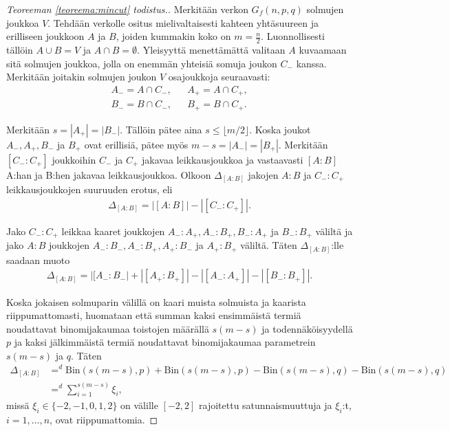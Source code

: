 \documentclass[finnish,12pt,a4paper,pdftex,sci,utf8]{aaltothesis}
\newcommand\floor[1]{\lfloor#1\rfloor}
\begin{document}
\begin{proof}[Teoreeman \ref{teoreema:mincut} todistus.]
	Merkitään verkon $G_f(n,p,q)$ solmujen joukkoa $V$.
	Tehdään verkolle ositus mielivaltaisesti kahteen yhtäsuureen ja erilliseen joukkoon $A$ ja $B$, joiden kummakin koko on $m = \frac{n}{2}$.
	Luonnollisesti tällöin $A \cup B = V$ ja $A \cap B = \emptyset$. Yleisyyttä menettämättä valitaan $A$ kuvaamaan sitä solmujen joukkoa, jolla on enemmän yhteisiä somuja joukon $C_-$ kanssa. Merkitään joitakin solmujen joukon $V$ osajoukkoja seuraavasti: 
\begin{eqnarray*}
	A_- = A \cap C_-, & & A_+ = A \cap C_+, \\
	B_- = B \cap C_-, & & B_+ = B \cap C_+.
\end{eqnarray*}

Merkitään $s = |A_+| = |B_-|$. Tällöin pätee aina $s \leq \floor{m/2}$. Koska joukot $A_-, A_+, B_-$ ja $B_+$ ovat erillisiä, pätee myös $m-s = |A_-| = |B_+|$. Merkitään $[C_- : C_+]$ joukkoihin $C_-$ ja $C_+$ jakavaa leikkausjoukkoa ja vastaavasti $[A:B]$ A:han ja B:hen jakavaa leikkausjoukkoa. Olkoon $\Delta_{[A:B]}$ jakojen $A:B$ ja $C_-:C_+$ leikkausjoukkojen suuruuden erotus, eli 
\begin{align*}
	\Delta_{[A:B]} = |[A:B]| - |[C_-:C_+]|.
\end{align*}

Jako $C_-:C_+$ leikkaa kaaret joukkojen $A_-:A_+, A_-:B_+, B_-:A_+$ ja $B_-:B_+$ väliltä ja jako $A:B$ joukkojen $A_-:B_-, A_-:B_+, A_+:B_-$ ja $A_+:B_+$ väliltä. Täten $\Delta_{[A:B]}$:lle saadaan muoto 
\begin{align*}
	\Delta_{[A:B]} = |[A_-:B_-| + |[A_+:B_+]| - |[A_-:A_+]| - |[B_-:B_+]|.
\end{align*}

Koska jokaisen solmuparin välillä on kaari muista solmuista ja kaarista riippumattomasti, huomataan että summan kaksi ensimmäistä termiä noudattavat binomijakaumaa toistojen määrällä $s(m-s)$ ja todennäköisyydellä $p$ ja kaksi jälkimmäistä termiä noudattavat binomijakaumaa parametrein $s(m-s)$ ja $q$. Täten
\begin{align*}
	\Delta_{[A:B]} &=^d \text{Bin}(s(m-s), p) + \text{Bin}(s(m-s), p) - \text{Bin}(s(m-s), q) - \text{Bin}(s(m-s), q) \\
	&=^d \sum_{i = 1}^{s(m-s)} \xi_i,
\end{align*}
missä $\xi_i \in \{-2, -1, 0, 1, 2\}$ on välille $[-2, 2]$ rajoitettu satunnaismuuttuja ja $\xi_i$:t, $i = 1, \ldots, n$, ovat riippumattomia.


\end{proof}
\end{document}
